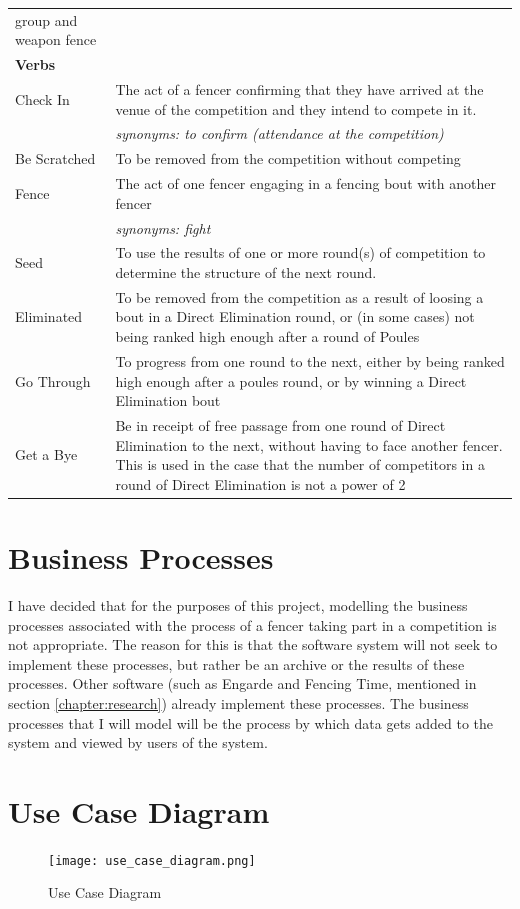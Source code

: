 \begin{center}
\begin{longtable}[l]{| p{} | p{} |}
 group and weapon fence \\
 \textbf{Verbs} & \\
 Check In & The act of a fencer confirming that they have arrived at the venue
 of the competition and they intend to compete in it. \\
 & \textit{synonyms: to confirm (attendance at the competition)} \\
 Be Scratched & To be removed from the competition without competing \\
 Fence & The act of one fencer engaging in a fencing bout with another fencer \\
 & \textit{synonyms: fight} \\
 Seed & To use the results of one or more round(s) of competition to determine
 the structure of the next round. \\
 Eliminated & To be removed from the competition as a result of loosing a bout
 in a Direct Elimination round, or (in some cases) not being ranked high enough
 after a round of Poules \\
 Go Through & To progress from one round to the next, either by being ranked
 high enough after a poules round, or by winning a Direct Elimination bout \\
 Get a Bye & Be in receipt of free passage from one round of Direct
 Elimination to the next, without having to face another fencer. This is used in
 the case that the number of competitors in a round of Direct Elimination is not
 a power of 2 \\
 \hline
\end{longtable}
\end{center}
\section{Business Processes} \label{section:businessProcesses}
I have decided that for the purposes of this project, modelling the business
processes associated with the process of a fencer taking part in a competition
is not appropriate. The reason for this is that the software system will not
seek to implement these processes, but rather be an archive or the results of
these processes. Other software (such as Engarde and Fencing Time, mentioned in
section \vref{chapter:research}) already implement these processes. The
business processes that I will model will be the process by which data gets
added to the system and viewed by users of the system.
\section{Use Case Diagram} \label{section:useCaseDiagram}
\begin{figure}[!ht]
  \centering
  \texttt{[image: use\_case\_diagram.png]}
  \caption{Use Case Diagram}
\end{figure}
